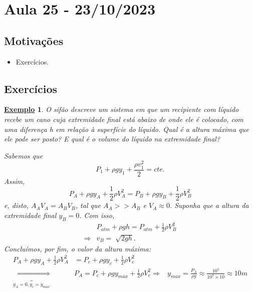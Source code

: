 \documentclass{article}
\newtheorem{example}{\underline{Exemplo}}
\begin{document}
\section{Aula 25 - 23/10/2023}
\subsection{Motivações}
\begin{itemize}
  \item Exercícios.
\end{itemize}
\subsection{Exercícios}
\begin{example}
  O sifão descreve um sistema em que um recipiente com líquido recebe um cano cuja extremidade final está abaixo de onde ele é colocado, com uma diferença h
  em relação à superfície do líquido. Qual é a altura máxima que ele pode ser posto? E qual é o volume do líquido na extremidade final?

  Sabemos que 
  \[
    P_{1} + \rho gy_{1} + \frac{\rho v_{1}^{2}}{2} = cte.
  \]
  Assim, 
  \[
    P_{A} + \rho gy_{A} + \frac{1}{2}\rho V_{A}^{2} = P_{B} + \rho gy_{B} + \frac{1}{2}\rho V_{B}^{2}
  \]
  e, disto, \(A_{A}V_{A} = A_{B}V_{B}\), tal que \(A_{A} >> A_{B}\) e \(V_{A}\approx 0\). Suponha que a altura da extremidade final \(y_{B} = 0\). Com isso, 
  \begin{align*}
  &P_{atm} + \rho gh = P_{atm} + \frac{1}{2}\rho V_{B}^{2}\\
    \Rightarrow& v_{B} = \sqrt[]{2gh}.
  \end{align*}
  Concluímos, por fim, o valor da altura máxima:
  \begin{align*}
    P_{A} + \rho gy_{A} + \frac{1}{2}\rho V_{A}^{2} &= P_{c} + \rho gy_{c} + \frac{1}{2}\rho V_{c}^{2}\\
    \underbrace{\Rightarrow}_{y_{A}=0, y_{c} = y_{max}} & P_{A} = P_{c} + \rho gy_{max} + \frac{1}{2}\rho V_{c}^{2}
    \Rightarrow  & y_{max} = \frac{P_{A}}{\rho g} \approx \frac{10^{5}}{10^{3}\times 10} \approx 10m
  \end{align*}
\end{example}
\end{document}
